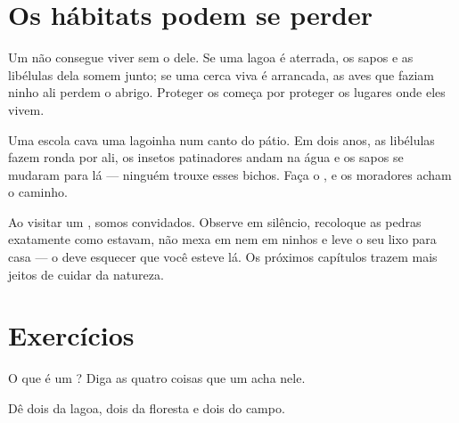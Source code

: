 \section{Os hábitats podem se perder}

\begin{proposition}\label{prop:g2:where-animals-live:loss}
Um  não consegue viver sem o  dele. Se uma lagoa é
aterrada, os sapos e as libélulas dela somem junto; se uma cerca
viva é arrancada, as aves que faziam ninho ali perdem o abrigo.
Proteger os  começa por proteger os lugares onde eles vivem.
\end{proposition}
\admitted

\begin{example}\label{ex:g2:where-animals-live:schoolpond}
Uma escola cava uma lagoinha num canto do pátio. Em dois anos, as
libélulas fazem ronda por ali, os insetos patinadores andam na água
e os sapos se mudaram para lá --- ninguém trouxe esses bichos.
Faça o , e os moradores acham o caminho.
\end{example}

\begin{remark}\label{rem:g2:where-animals-live:respect}
Ao visitar um , somos convidados. Observe em silêncio,
recoloque as pedras exatamente como estavam, não mexa em  nem em
ninhos e leve o seu lixo para casa --- o  deve esquecer que
você esteve lá. Os próximos capítulos trazem mais jeitos de cuidar
da natureza.
\end{remark}

\section{Exercícios}

\begin{exercise}[$\star$]\label{exo:g2:where-animals-live:1}
O que é um ? Diga as quatro coisas que um  acha nele.
\end{exercise}

\begin{exercise}[$\star$]\label{exo:g2:where-animals-live:2}
Dê dois  da lagoa, dois da floresta e dois do campo.
\end{exercise}

